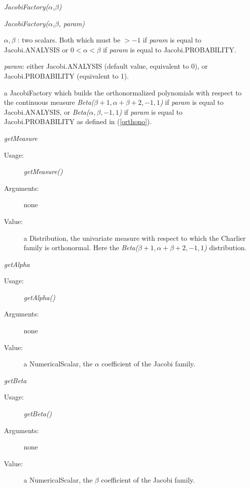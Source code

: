 \begin{description}
\item[Usage:]
\begin{description}
\item \textit{JacobiFactory($\alpha$,$\beta$)}
\item \textit{JacobiFactory($\alpha$,$\beta$, param)}
\end{description}

\item[Arguments:]
\begin{description}
\item $\alpha, \beta$ : two scalars. Both which must be $> -1$ if \textit{param} is equal to Jacobi.ANALYSIS or $0<\alpha<\beta$ if \textit{param} is equal to Jacobi.PROBABILITY.
\item \textit{param}: either Jacobi.ANALYSIS (default value, equivalent to 0), or Jacobi.PROBABILITY (equivalent to 1).
\end{description}

\item[Value:]  a JacobiFactory  which builds the orthonormalized polynomials with respect to the continuous measure \textit{Beta($\beta + 1, \alpha + \beta + 2, -1, 1$)} if \textit{param} is equal to Jacobi.ANALYSIS, or \textit{Beta($\alpha, \beta, -1, 1$)} if \textit{param} is equal to Jacobi.PROBABILITY as defined in (\ref{orthono}).

\item[Some methods :]  \rule{0pt}{1em}

\begin{description}
\item \textit{getMeasure}
\begin{description}
\item[Usage:] \textit{getMeasure()}
\item[Arguments:] none
\item[Value:]  a Distribution, the univariate measure with respect to which the Charlier family is orthonormal. Here the \textit{Beta($\beta + 1, \alpha + \beta + 2, -1, 1$)} distribution.
\end{description}
\bigskip

\item \textit{getAlpha}
\begin{description}
\item[Usage:] \textit{getAlpha()}
\item[Arguments:] none
\item[Value:]  a NumericalScalar, the $\alpha$ coefficient of the Jacobi family.
\end{description}
\bigskip

\item \textit{getBeta}
\begin{description}
\item[Usage:] \textit{getBeta()}
\item[Arguments:] none
\item[Value:]  a NumericalScalar, the $\beta$ coefficient of the Jacobi family.
\end{description}

\end{description}
\end{description}

